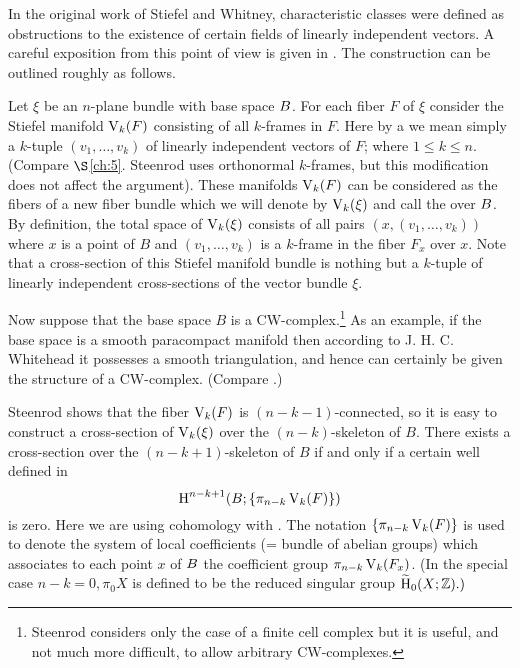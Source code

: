 \documentclass[../main]{subfiles}
\begin{document}
In the original work of Stiefel and Whitney, characteristic classes were defined as obstructions to the existence of certain fields of linearly independent vectors. A careful exposition from this point of view is given in \cite[\S 25.6,35 and 38]{steenrod1951}. The construction can be outlined roughly as follows.

Let $\xi$ be an $n$-plane bundle with base space $B$. For each fiber $F$ of $\xi$ consider the Stiefel manifold $\operatorname{V}_{k}(F)$ consisting of all $k$-frames in $F$. Here by a  we mean simply a $k$-tuple $(v_{1}, \ldots, v_{k})$ of linearly independent vectors of $F$; where $1 \leq k \leq n$. (Compare $\S$\ref{ch:5}. Steenrod uses orthonormal $k$-frames, but this modification does not affect the argument). These manifolds $\operatorname{V}_{k}(F)$ can be considered as the fibers of a new fiber bundle which we will denote by $\operatorname{V}_{k}(\xi)$ and call the  over $B$. By definition, the total space of $\operatorname{V}_{k}(\xi)$ consists of all pairs $(x,(v_{1}, \ldots, v_{k}))$ where $x$ is a point of $B$ and $(v_{1}, \ldots, v_{k})$ is a $k$-frame in the fiber $F_{x}$ over $x$. Note that a cross-section of this Stiefel manifold bundle is nothing but a $k$-tuple of linearly independent cross-sections of the vector bundle $\xi$.

Now suppose that the base space $B$ is a CW-complex.\footnote{Steenrod considers only the case of a finite cell complex but it is useful, and not much more difficult, to allow arbitrary CW-complexes.} As an example, if the base space is a smooth paracompact manifold then according to J. H. C. Whitehead it possesses a smooth triangulation, and hence can certainly be given the structure of a CW-complex. (Compare \cite{munkres2000topology}.)

 Steenrod shows that the fiber $\operatorname{V}_{k}(F)$ is $(n-k-1)$-connected, so it is easy to construct a cross-section of $\operatorname{V}_{k}(\xi)$ over the $(n-k)$-skeleton of $B$. There exists a cross-section over the $(n-k+1)$-skeleton of $B$ if and only if a certain well defined  in
\[
\operatorname{H}^{n-k+1}(B ;\{\pi_{n-k} \operatorname{V}_{k}(F)\})
\]
is zero. Here we are using cohomology with . The notation $\{\pi_{n-k}\operatorname{V}_{k}(F)\}$ is used to denote the system of local coefficients (= bundle of abelian groups) which associates to each point $x$ of $B$ the coefficient group $\pi_{n-k} \operatorname{V}_{k}(F_{x})$. (In the special case $n-k=0, \pi_{0} X$ is defined to be the reduced singular group $\xtilde{\homology}_{0}(X ; \mathbb{Z}) .)$
\end{document}
